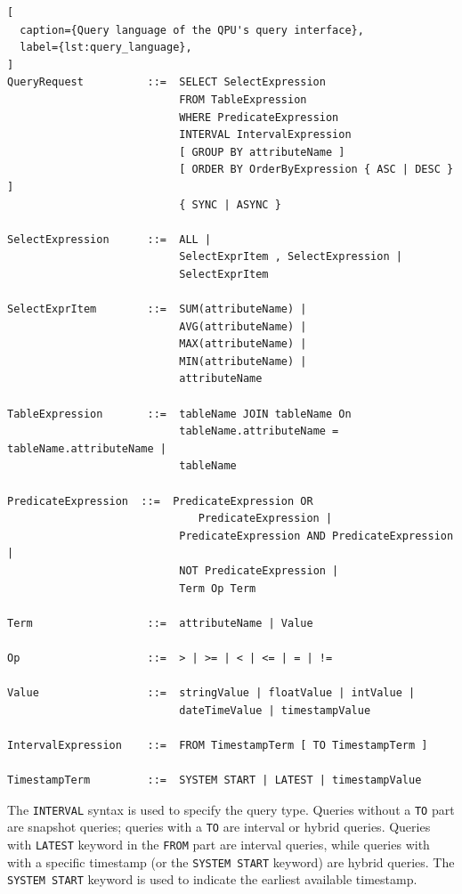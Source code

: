 \begin{lstlisting}[
  caption={Query language of the QPU's query interface},
  label={lst:query_language},
]
QueryRequest          ::=  SELECT SelectExpression
                           FROM TableExpression
                           WHERE PredicateExpression
                           INTERVAL IntervalExpression
                           [ GROUP BY attributeName ]
                           [ ORDER BY OrderByExpression { ASC | DESC } ]
                           { SYNC | ASYNC }

SelectExpression      ::=  ALL |
                           SelectExprItem , SelectExpression |
                           SelectExprItem

SelectExprItem        ::=  SUM(attributeName) |
                           AVG(attributeName) |
                           MAX(attributeName) |
                           MIN(attributeName) |
                           attributeName

TableExpression       ::=  tableName JOIN tableName On
                           tableName.attributeName = tableName.attributeName |
                           tableName

PredicateExpression  ::=  PredicateExpression OR
                              PredicateExpression |
                           PredicateExpression AND PredicateExpression |
                           NOT PredicateExpression |
                           Term Op Term

Term                  ::=  attributeName | Value

Op                    ::=  > | >= | < | <= | = | !=

Value                 ::=  stringValue | floatValue | intValue |
                           dateTimeValue | timestampValue

IntervalExpression    ::=  FROM TimestampTerm [ TO TimestampTerm ]

TimestampTerm         ::=  SYSTEM START | LATEST | timestampValue

\end{lstlisting}

The \texttt{INTERVAL} syntax is used to specify the query type.
Queries without a \texttt{TO} part are snapshot queries;
queries with a \texttt{TO} are interval or hybrid queries.
Queries with \texttt{LATEST} keyword in the \texttt{FROM} part are interval queries,
while queries with with a specific timestamp (or the \texttt{SYSTEM START} keyword) are
hybrid queries.
The \texttt{SYSTEM START} keyword is used to indicate the earliest available timestamp.

